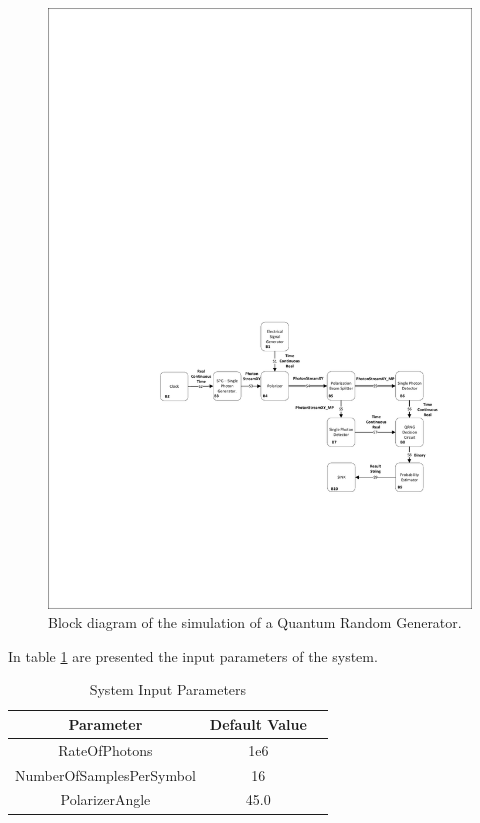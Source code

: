 \begin{figure}[h]
    \centering
        \includegraphics[clip, trim=5cm 5cm 0.5cm 15cm, width=1.00\textwidth]{./sdf/quantum_random_number_generator/figures/Simulation_qrng.pdf}
    \caption{Block diagram of the simulation of a Quantum Random Generator.}\label{sim_qrng}
\end{figure}

In table \ref{tb:inputparameters2} are presented the input parameters of the system.


\begin{table}[H]
\centering
\caption{System Input Parameters}
\label{tb:inputparameters2}
\begin{tabular}{|c|c|c|}
\hline
\textbf{Parameter}                      & \textbf{Default Value}                                       \\ \hline
RateOfPhotons                           & 1e6                                                          \\ \hline
NumberOfSamplesPerSymbol                & 16                                                           \\ \hline
PolarizerAngle                          & 45.0                                                         \\ \hline

\end{tabular}
\end{table}

